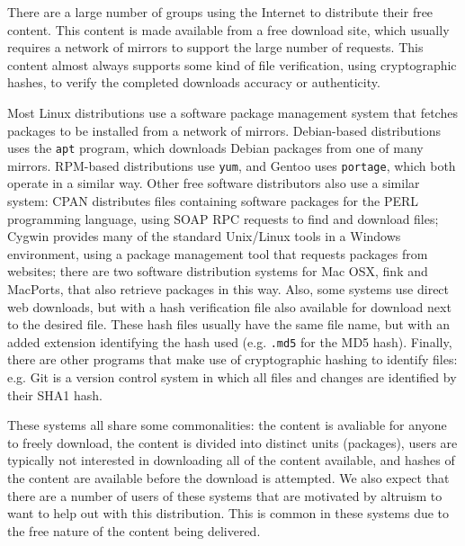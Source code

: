 \documentclass[conference]{IEEEtran}
\begin{document}
There are a large number of groups using the Internet to distribute
their free content. This content is made available from a free
download site, which usually requires a network of mirrors to
support the large number of requests. This content almost always
supports some kind of file verification, using cryptographic hashes,
to verify the completed downloads accuracy or authenticity.

Most Linux distributions use a software package management system
that fetches packages to be installed from a network of mirrors.
Debian-based distributions uses the \texttt{apt} program, which
downloads Debian packages from one of many mirrors. RPM-based
distributions use \texttt{yum}, and Gentoo uses \texttt{portage},
which both operate in a similar way. Other free software
distributors also use a similar system: CPAN distributes files
containing software packages for the PERL programming language,
using SOAP RPC requests to find and download files; Cygwin provides
many of the standard Unix/Linux tools in a Windows environment,
using a package management tool that requests packages from
websites; there are two software distribution systems for Mac OSX,
fink and MacPorts, that also retrieve packages in this way. Also,
some systems use direct web downloads, but with a hash verification
file also available for download next to the desired file. These
hash files usually have the same file name, but with an added
extension identifying the hash used (e.g. \texttt{.md5} for the MD5
hash). Finally, there are other programs that make use of
cryptographic hashing to identify files: e.g. Git is a version
control system in which all files and changes are identified by
their SHA1 hash.

These systems all share some commonalities: the content is avaliable
for anyone to freely download, the content is divided into distinct
units (packages), users are typically not interested in downloading
all of the content available, and hashes of the content are
available before the download is attempted. We also expect that
there are a number of users of these systems that are motivated by
altruism to want to help out with this distribution. This is common
in these systems due to the free nature of the content being
delivered.

\end{document}
